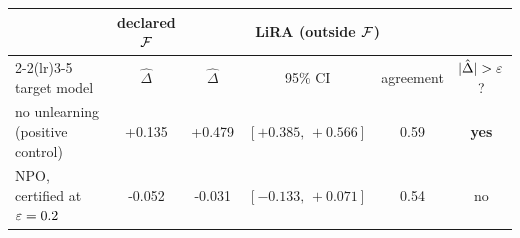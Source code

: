 \begin{tabular}{lccccc}
\toprule
& declared $\mathcal{F}$ & \multicolumn{3}{c}{LiRA (outside $\mathcal{F}$)} & \\
\cmidrule(lr){2-2}\cmidrule(lr){3-5}
target model & $\hat\Delta$ & $\hat\Delta$ & 95\% CI & agreement & $|\hat\Delta| > \varepsilon$?\\
\midrule
no unlearning (positive control) & +0.135 & +0.479 & $[+0.385,\,+0.566]$ & 0.59 & \textbf{yes}\\
NPO, certified at $\varepsilon=0.2$ & -0.052 & -0.031 & $[-0.133,\,+0.071]$ & 0.54 & no\\
\bottomrule
\end{tabular}
